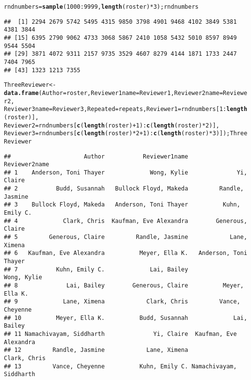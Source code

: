 \documentclass{tufte-handout}\usepackage[]{graphicx}\usepackage[]{color}
\makeatletter
\newcommand{\hlnum}[1]{\textcolor[rgb]{0.686,0.059,0.569}{#1}}%
\newcommand{\hlopt}[1]{\textcolor[rgb]{0,0,0}{#1}}%
\newcommand{\hlstd}[1]{\textcolor[rgb]{0.345,0.345,0.345}{#1}}%
\newcommand{\hlkwb}[1]{\textcolor[rgb]{0.69,0.353,0.396}{#1}}%
\newcommand{\hlkwc}[1]{\textcolor[rgb]{0.333,0.667,0.333}{#1}}%
\newcommand{\hlkwd}[1]{\textcolor[rgb]{0.737,0.353,0.396}{\textbf{#1}}}%
\newenvironment{kframe}{%
 \def\at@end@of@kframe{}%
 \ifinner\ifhmode%
  \def\at@end@of@kframe{\end{minipage}}%
  \begin{minipage}{\columnwidth}%
 \fi\fi%
 \def\FrameCommand##1{\hskip\@totalleftmargin \hskip-\fboxsep
 \colorbox{shadecolor}{##1}\hskip-\fboxsep
     \hskip-\linewidth \hskip-\@totalleftmargin \hskip\columnwidth}%
 \MakeFramed {\advance\hsize-\width
   \@totalleftmargin\z@ \linewidth\hsize
   \@setminipage}}%
 {\par\unskip\endMakeFramed%
 \at@end@of@kframe}
\newenvironment{knitrout}{}{} %
\makeatother
\begin{document}
\begin{knitrout}
\begin{kframe}
\begin{alltt}
\hlstd{rndnumbers} \hlkwb{=} \hlkwd{sample}\hlstd{(}\hlnum{1000}\hlopt{:}\hlnum{9999}\hlstd{,}\hlkwd{length}\hlstd{(roster)}\hlopt{*}\hlnum{3}\hlstd{);rndnumbers}
\end{alltt}
\begin{verbatim}
##  [1] 2294 2679 5742 5495 4315 9850 3798 4901 9468 4102 3849 5381 4381 3844
## [15] 6395 2790 9062 4733 3068 5867 2410 1058 5432 5010 8597 8949 9544 5504
## [29] 3871 4072 9311 2157 9735 3529 4607 8279 4144 1871 1733 2447 7404 7965
## [43] 1323 1213 7355
\end{verbatim}
\begin{alltt}
\hlstd{ThreeReviewer} \hlkwb{<-} \hlkwd{data.frame}\hlstd{(}\hlkwc{Author}\hlstd{=roster,} \hlkwc{Reviewer1name}\hlstd{=Reviewer1,} \hlkwc{Reviewer2name}\hlstd{=Reviewer2,}
\hlkwc{Reviewer3name}\hlstd{=Reviewer3,} \hlkwc{Repeated}\hlstd{=repeats,} \hlkwc{Reviewer1}\hlstd{=rndnumbers[}\hlnum{1}\hlopt{:}\hlkwd{length}\hlstd{(roster)],}
\hlkwc{Reviewer2}\hlstd{=rndnumbers[}\hlkwd{c}\hlstd{(}\hlkwd{length}\hlstd{(roster)}\hlopt{+}\hlnum{1}\hlstd{)}\hlopt{:}\hlkwd{c}\hlstd{(}\hlkwd{length}\hlstd{(roster)}\hlopt{*}\hlnum{2}\hlstd{)],}
\hlkwc{Reviewer3}\hlstd{=rndnumbers[}\hlkwd{c}\hlstd{(}\hlkwd{length}\hlstd{(roster)}\hlopt{*}\hlnum{2}\hlopt{+}\hlnum{1}\hlstd{)}\hlopt{:}\hlkwd{c}\hlstd{(}\hlkwd{length}\hlstd{(roster)}\hlopt{*}\hlnum{3}\hlstd{)]); ThreeReviewer}
\end{alltt}
\begin{verbatim}
##                     Author           Reviewer1name           Reviewer2name
## 1    Anderson, Toni Thayer             Wong, Kylie              Yi, Claire
## 2           Budd, Susannah   Bullock Floyd, Makeda         Randle, Jasmine
## 3    Bullock Floyd, Makeda   Anderson, Toni Thayer          Kuhn, Emily C.
## 4             Clark, Chris  Kaufman, Eve Alexandra        Generous, Claire
## 5         Generous, Claire         Randle, Jasmine            Lane, Ximena
## 6   Kaufman, Eve Alexandra          Meyer, Ella K.   Anderson, Toni Thayer
## 7           Kuhn, Emily C.             Lai, Bailey             Wong, Kylie
## 8              Lai, Bailey        Generous, Claire          Meyer, Ella K.
## 9             Lane, Ximena            Clark, Chris         Vance, Cheyenne
## 10          Meyer, Ella K.          Budd, Susannah             Lai, Bailey
## 11 Namachivayam, Siddharth              Yi, Claire  Kaufman, Eve Alexandra
## 12         Randle, Jasmine            Lane, Ximena            Clark, Chris
## 13         Vance, Cheyenne          Kuhn, Emily C. Namachivayam, Siddharth

\end{verbatim}
\end{kframe}
\end{knitrout}
\end{document}
